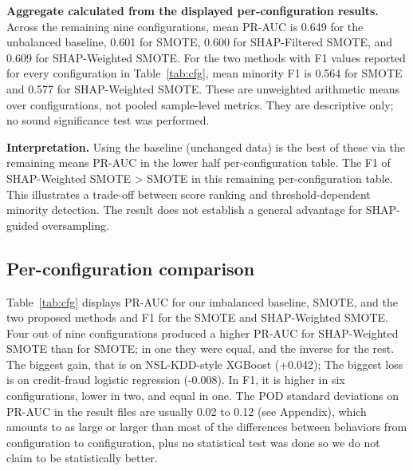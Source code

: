 \documentclass[conference]{IEEEtran}
\begin{document}
\textbf{Aggregate calculated from the displayed per-configuration results.} Across the remaining nine configurations, mean PR-AUC is 0.649 for the unbalanced baseline, 0.601 for SMOTE, 0.600 for SHAP-Filtered SMOTE, and 0.609 for SHAP-Weighted SMOTE. For the two methods with F1 values reported for every configuration in Table~\ref{tab:cfg}, mean minority F1 is 0.564 for SMOTE and 0.577 for SHAP-Weighted SMOTE. These are unweighted arithmetic means over configurations, not pooled sample-level metrics. They are descriptive only; no sound significance test was performed.

\textbf{Interpretation.} Using the baseline (unchanged data) is the best of these via the remaining means PR-AUC in the lower half per-configuration table. The F1 of SHAP-Weighted SMOTE > SMOTE in this remaining per-configuration table. This illustrates a trade-off between score ranking and threshold-dependent minority detection. The result does not establish a general advantage for SHAP-guided oversampling.

\subsection{Per-configuration comparison}
Table~\ref{tab:cfg} displays PR-AUC for our imbalanced baseline, SMOTE, and the two proposed methods and F1 for the SMOTE and SHAP-Weighted SMOTE. Four out of nine configurations produced a higher PR-AUC for SHAP-Weighted SMOTE than for SMOTE; in one they were equal, and the inverse for the rest. The biggest gain, that is on NSL-KDD-style XGBoost (+0.042); The biggest loss is on credit-fraud logistic regression (-0.008). In F1, it is higher in six configurations, lower in two, and equal in one. The POD standard deviations on PR-AUC in the result files are usually 0.02 to 0.12 (see Appendix), which amounts to as large or larger than most of the differences between behaviors from configuration to configuration, plus no statistical test was done so we do not claim to be statistically better. 
\end{document}
